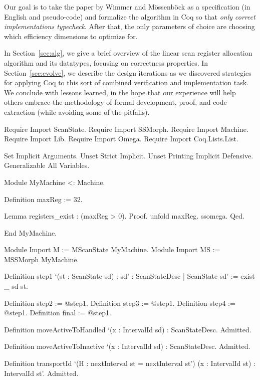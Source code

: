 \documentclass{llncs}
\newif\ifdraft\draftfalse  %
\newcommand{\comment}[3]{\ifdraft\textcolor{#1}{[#2: #3]}\else\fi}
\newcommand{\fixme}[1]{\comment{red}{FIXME}{#1}}
\newcommand{\todo}[1]{\comment{red}{TO DO}{#1}}
\begin{document}
Our goal is to take the paper by Wimmer and M\"{o}ssenb\"{o}ck as a
specification (in English and pseudo-code) and formalize the algorithm in Coq
so that \emph{only correct implementations typecheck}.  After that, the
only parameters of choice are choosing which efficiency dimensions to
optimize for.

\fixme{Rewrite section overview}In Section~\ref{sec:alg}, we give a
brief overview of the linear scan register allocation algorithm and
its datatypes, focusing on correctness properties. In
Section~\ref{sec:evolve}, we describe the design iterations as we
discovered strategies for applying Coq to this sort of combined
verification and implementation task.  We conclude with lessons
learned, in the hope that our experience will help others embrace the
methodology of formal development, proof, and code extraction (while
avoiding some of the pitfalls).

\todo{Add pointer to github repo containing all proofs and extracted
  Haskell (and maybe extended version of this paper).}

\begin{coq_eval}
Require Import ScanState.
Require Import SSMorph.
Require Import Machine.
Require Import Lib.
Require Import Omega.
Require Import Coq.Lists.List.

Set Implicit Arguments.
Unset Strict Implicit.
Unset Printing Implicit Defensive.
Generalizable All Variables.

Module MyMachine <: Machine.

Definition maxReg := 32.

Lemma registers_exist : (maxReg > 0).
Proof. unfold maxReg. ssomega. Qed.

End MyMachine.

Module Import M := MScanState MyMachine.
Module Import MS := MSSMorph MyMachine.

Definition step1 `(st : ScanState sd)
  : { sd' : ScanStateDesc | ScanState sd' } :=
  exist _ sd st.

Definition step2 := @step1.
Definition step3 := @step1.
Definition step4 := @step1.
Definition final := @step1.

Definition moveActiveToHandled `(x : IntervalId sd) : ScanStateDesc.
Admitted.

Definition moveActiveToInactive `(x : IntervalId sd) : ScanStateDesc.
Admitted.

Definition transportId `(H : nextInterval st = nextInterval st')
  (x : IntervalId st) : IntervalId st'.
Admitted.
\end{coq_eval}
\end{document}
